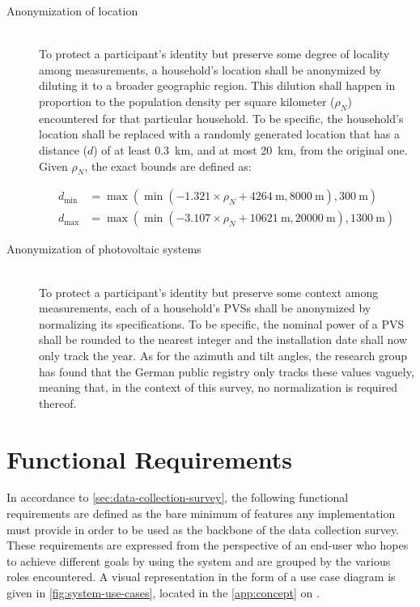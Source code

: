 \begin{description}
  \item[Anonymization of location]
  \hfill \\
  To protect a participant's identity but preserve some degree of locality among measurements, a household's location shall be anonymized by diluting it to a broader geographic region. This dilution shall happen in proportion to the population density per square  kilometer ($\rho_N$) encountered for that particular household. To be specific, the household's location shall be replaced with a randomly generated location that has a distance ($d$) of at least \SI{0.3}{\kilo\meter}, and at most \SI{20}{\kilo\meter}, from the original one. Given $\rho_N$, the exact bounds are defined as:

\begin{equation}
  \begin{aligned}
  d_{\text{min}} &= \max{(\min(-1.321 \times \rho_N + \SI{4264}{\meter}, \SI{8000}{\meter}), \SI{300}{\meter})}\\
  d_{\text{max}} &= \max{(\min(-3.107 \times \rho_N + \SI{10621}{\meter}, \SI{20000}{\meter}), \SI{1300}{\meter})}
  \end{aligned}
\label{eq:anonymize-location-min-max-distance}
\end{equation}

  \item[Anonymization of photovoltaic systems]
  \hfill \\
  To protect a participant's identity but preserve some context among measurements, each of a household's \acsp{PVS} shall be anonymized by normalizing its specifications. To be specific, the nominal power of a \ac{PVS} shall be rounded to the nearest integer and the installation date shall now only track the year. As for the azimuth and tilt angles, the research group has found that the German public registry only tracks these values vaguely, meaning that, in the context of this survey, no normalization is required thereof.
\end{description}


\section{Functional Requirements}
\label{sec:functional-requirements}

In accordance to \autoref{sec:data-collection-survey}, the following functional requirements are defined as the bare minimum of features any implementation must provide in order to be used as the backbone of the data collection survey. These requirements are expressed from the perspective of an end-user who hopes to achieve different goals by using the system and are grouped by the various roles encountered. A visual representation in the form of a use case diagram is given in \autoref{fig:system-use-cases}, located in the \autoref{app:concept} on .

